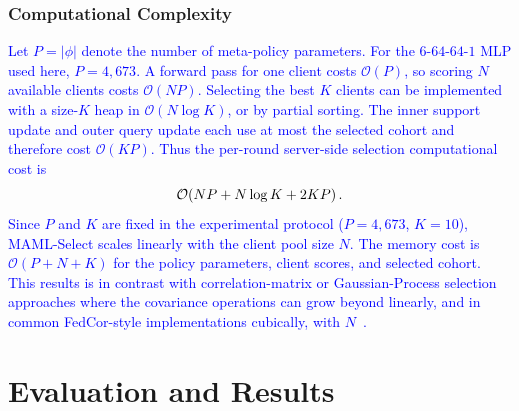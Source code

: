 \documentclass[journal]{IEEEtran}
\newcommand{\revision}[1]{\textcolor{blue}{#1}}
\begin{document}
\subsubsection{Computational Complexity}
\revision{Let $P=|\phi|$ denote the number of meta-policy parameters. For the $6$-$64$-$64$-$1$ MLP used here, $P=4{,}673$. A forward pass for one client costs $\mathcal{O}(P)$, so scoring $N$ available clients costs $\mathcal{O}(NP)$. Selecting the best $K$ clients can be implemented with a size-$K$ heap in $\mathcal{O}(N\log K)$, or by partial sorting. The inner support update and outer query update each use at most the selected cohort and therefore cost $\mathcal{O}(KP)$. Thus the per-round server-side selection computational cost is}
\begin{equation}
	\color{black}
	\mathcal{O}\!\left(NP + N\log K + 2KP\right).
	\label{eq:selector_complexity}
\end{equation}
\revision{Since $P$ and $K$ are fixed in the experimental protocol ($P=4{,}673$, $K=10$), MAML-Select scales linearly with the client pool size $N$. The memory cost is $\mathcal{O}(P+N+K)$ for the policy parameters, client scores, and selected cohort. This results is in contrast with correlation-matrix or Gaussian-Process selection approaches where the covariance operations can grow beyond linearly, and in common FedCor-style implementations cubically, with $N$~\cite{tang2022fedcor}.}

\section{Evaluation and Results}
\end{document}
